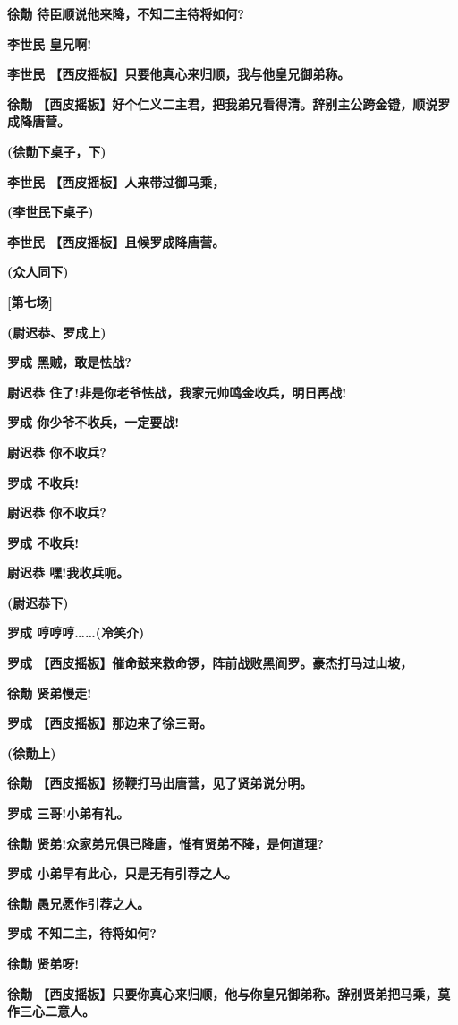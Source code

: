 \textbf{徐勣 待臣顺说他来降，不知二主待将如何?}

\textbf{李世民 皇兄啊!}

\textbf{李世民 【西皮摇板】只要他真心来归顺，我与他皇兄御弟称。}

\textbf{徐勣
【西皮摇板】好个仁义二主君，把我弟兄看得清。辞别主公跨金镫，顺说罗成降唐营。}

\textbf{(徐勣下桌子，下)}

\textbf{李世民 【西皮摇板】人来带过御马乘，}

\textbf{(李世民下桌子)}

\textbf{李世民 【西皮摇板】且候罗成降唐营。}

\textbf{(众人同下)}

\textbf{{[}第七场{]}}

\textbf{(尉迟恭、罗成上)}

\textbf{罗成 黑贼，敢是怯战?}

\textbf{尉迟恭 住了!非是你老爷怯战，我家元帅鸣金收兵，明日再战!}

\textbf{罗成 你少爷不收兵，一定要战!}

\textbf{尉迟恭 你不收兵?}

\textbf{罗成 不收兵!}

\textbf{尉迟恭 你不收兵?}

\textbf{罗成 不收兵!}

\textbf{尉迟恭 嘿!我收兵呃。}

\textbf{(尉迟恭下)}

\textbf{罗成 哼哼哼\ldots{}\ldots{}(冷笑介)}

\textbf{罗成
【西皮摇板】催命鼓来救命锣，阵前战败黑阎罗。豪杰打马过山坡，}

\textbf{徐勣 贤弟慢走!}

\textbf{罗成 【西皮摇板】那边来了徐三哥。}

\textbf{(徐勣上)}

\textbf{徐勣 【西皮摇板】扬鞭打马出唐营，见了贤弟说分明。}

\textbf{罗成 三哥!小弟有礼。}

\textbf{徐勣 贤弟!众家弟兄俱已降唐，惟有贤弟不降，是何道理?}

\textbf{罗成 小弟早有此心，只是无有引荐之人。}

\textbf{徐勣 愚兄愿作引荐之人。}

\textbf{罗成 不知二主，待将如何?}

\textbf{徐勣 贤弟呀!}

\textbf{徐勣
【西皮摇板】只要你真心来归顺，他与你皇兄御弟称。辞别贤弟把马乘，莫作三心二意人。}

